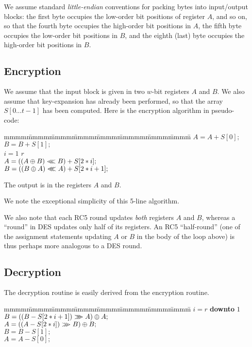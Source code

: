 We assume standard {\em little-endian} conventions for packing bytes
into input/output blocks: the first byte occupies the low-order bit
positions of register $A$, and so on, so that the fourth byte occupies
the high-order bit positions in $A$, the fifth byte occupies the low-order
bit positions in $B$, and the eighth (last) byte occupies the high-order
bit positions in $B$.  

\newpage
\subsection{Encryption}

We assume that the input block is given in two $w$-bit registers
$A$ and $B$.  
We also assume that
key-expansion has already been performed, so that the array $S[0...t-1]$  
has been computed.
Here is the encryption algorithm in pseudo-code:

\begin{tabbing}
mmmm\=mmmm\=mmmm\=mmmm\=mmmm\=mmmmm\=mmmm\=mmmm\=\kill
\>$A = A + S[0];$ \\
\>$B = B + S[1];$ \\
\>\FOR $i = 1$ \TO $r$ \DO \\
\>\>$A = ((A\oplus B) <\!\!\!<\!\!\!< B) + S[2*i];$ \\
\>\>$B = ((B\oplus A) <\!\!\!<\!\!\!< A) + S[2*i+1];$ \\
\end{tabbing}
The output is in the registers $A$ and $B$.

We note the exceptional simplicity of this 5-line algorithm.

We also note that each RC5 round updates {\em both} registers $A$ and
$B$, whereas a ``round'' in DES updates only half of its registers.
An RC5 ``half-round'' (one of the assignment statements updating $A$
or $B$ in the body of the loop above) is thus perhaps more analogous
to a DES round.

\subsection{Decryption}

The decryption routine is easily derived from the encryption
routine.

\begin{tabbing}
mmmm\=mmmm\=mmmm\=mmmm\=mmmm\=mmmmm\=mmmm\=mmmm\=\kill
\>\FOR $i = r$ {\bf downto} $1$ \DO \\
\>\>$B = ((B - S[2*i+1]) >\!\!\!>\!\!\!> A) \oplus A;$ \\
\>\>$A = ((A - S[2*i])   >\!\!\!>\!\!\!> B) \oplus B;$ \\
\>$B = B - S[1];$ \\
\>$A = A - S[0];$ 
\end{tabbing}

